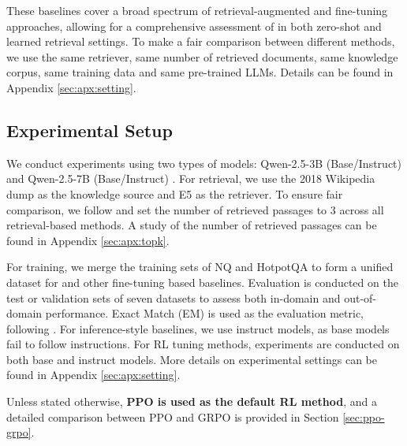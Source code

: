 These baselines cover a broad spectrum of retrieval-augmented and fine-tuning approaches, allowing for a comprehensive assessment of \Ours in both zero-shot and learned retrieval settings.
To make a fair comparison between different methods, we use the same retriever, same number of retrieved documents, same knowledge corpus, same training data and same pre-trained LLMs. Details can be found in Appendix \ref{sec:apx:setting}.

\subsection{Experimental Setup}\label{sec:exp-setup}

We conduct experiments using two types of models: Qwen-2.5-3B (Base/Instruct) and Qwen-2.5-7B (Base/Instruct) \citep{yang2024qwen2}.
For retrieval, we use the 2018 Wikipedia dump \citep{karpukhin2020dense} as the knowledge source and E5 \citep{wang2022text} as the retriever. To ensure fair comparison, we follow \cite{lin2023ra} and set the number of retrieved passages to 3 across all retrieval-based methods. 
A study of the number of retrieved passages can be found in Appendix \ref{sec:apx:topk}.

For training, we merge the training sets of NQ and HotpotQA to form a unified dataset for \Ours and other fine-tuning based baselines. Evaluation is conducted on the test or validation sets of seven datasets to assess both in-domain and out-of-domain performance. Exact Match (EM) is used as the evaluation metric, following \cite{yu2024rankrag}.
For inference-style baselines, we use instruct models, as base models fail to follow instructions. For RL tuning methods, experiments are conducted on both base and instruct models. More details on experimental settings can be found in Appendix \ref{sec:apx:setting}.

Unless stated otherwise, \textbf{PPO is used as the default RL method}, and a detailed comparison between PPO and GRPO is provided in Section \ref{sec:ppo-grpo}.

